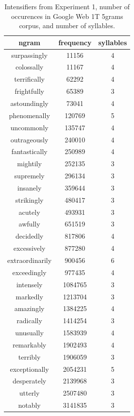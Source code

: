 \documentclass[10pt,letterpaper]{article}
\begin{document}
\nocite{web1t5gram}
\nocite{lewis}

\begin{table}[ht]
 \begin{center}
  \caption{Intensifiers from Experiment 1, number of occurences in Google Web 1T 5grams corpus, and number of syllables.}
  \label{exp1-intensifiers}
  \begin{tabular}{ccc}
   \hline
   ngram & frequency & syllables \\
    \hline
    surpassingly & 11156 & 4 \\
    colossally & 11167 & 4 \\
    terrifically & 62292 & 4 \\
    frightfully & 65389 & 3 \\
    astoundingly & 73041 & 4 \\
    phenomenally & 120769 & 5 \\
    uncommonly & 135747 & 4 \\
    outrageously & 240010 & 4 \\
    fantastically & 250989 & 4 \\
    mightily & 252135 & 3 \\
    supremely & 296134 & 3 \\
    insanely & 359644 & 3 \\
    strikingly & 480417 & 3 \\
    acutely & 493931 & 3 \\
    awfully & 651519 & 3 \\
    decidedly & 817806 & 4 \\
    excessively & 877280 & 4 \\
    extraordinarily & 900456 & 6 \\
    exceedingly & 977435 & 4 \\
    intensely & 1084765 & 3 \\
    markedly & 1213704 & 3 \\
    amazingly & 1384225 & 4 \\
    radically & 1414254 & 3 \\
    unusually & 1583939 & 4 \\
    remarkably & 1902493 & 4 \\
    terribly & 1906059 & 3 \\
    exceptionally & 2054231 & 5 \\
    desperately & 2139968 & 3 \\
    utterly & 2507480 & 3 \\
    notably & 3141835 & 3 \\

\end{tabular}
\end{center}
\end{table}
\end{document}
